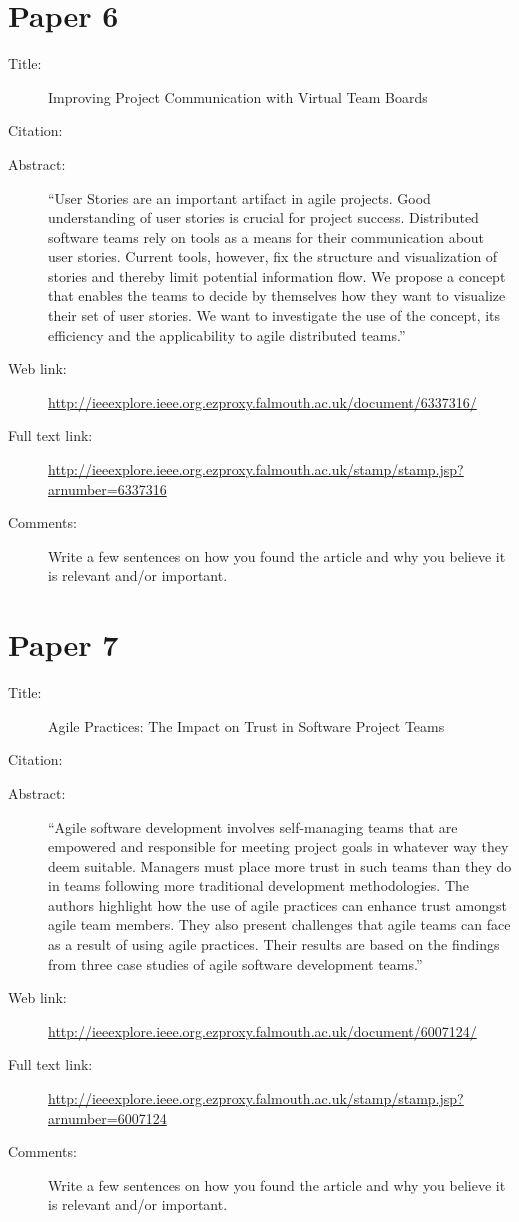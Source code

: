 \documentclass{scrartcl}
\begin{document}
\section*{Paper 6}
\begin{description}
\item[Title:] Improving Project Communication with Virtual Team Boards
\item[Citation:] \cite{bibtex_key}
\item[Abstract:] ``User Stories are an important artifact in agile projects. Good understanding of user stories is crucial for project success. Distributed software teams rely on tools as a means for their communication about user stories. Current tools, however, fix the structure and visualization of stories and thereby limit potential information flow. We propose a concept that enables the teams to decide by themselves how they want to visualize their set of user stories. We want to investigate the use of the concept, its efficiency and the applicability to agile distributed teams.''
\item[Web link:] \url{http://ieeexplore.ieee.org.ezproxy.falmouth.ac.uk/document/6337316/}
\item[Full text link:] \url{http://ieeexplore.ieee.org.ezproxy.falmouth.ac.uk/stamp/stamp.jsp?arnumber=6337316}
\item[Comments:] Write a few sentences on how you found the article and why you believe it is relevant and/or important.
\end{description}

\section*{Paper 7}
\begin{description}
\item[Title:] Agile Practices: The Impact on Trust in Software Project Teams
\item[Citation:] \cite{bibtex_key}
\item[Abstract:] ``Agile software development involves self-managing teams that are empowered and responsible for meeting project goals in whatever way they deem suitable. Managers must place more trust in such teams than they do in teams following more traditional development methodologies. The authors highlight how the use of agile practices can enhance trust amongst agile team members. They also present challenges that agile teams can face as a result of using agile practices. Their results are based on the findings from three case studies of agile software development teams.''
\item[Web link:] \url{http://ieeexplore.ieee.org.ezproxy.falmouth.ac.uk/document/6007124/}
\item[Full text link:] \url{http://ieeexplore.ieee.org.ezproxy.falmouth.ac.uk/stamp/stamp.jsp?arnumber=6007124}
\item[Comments:] Write a few sentences on how you found the article and why you believe it is relevant and/or important.
\end{description}
\end{document}
